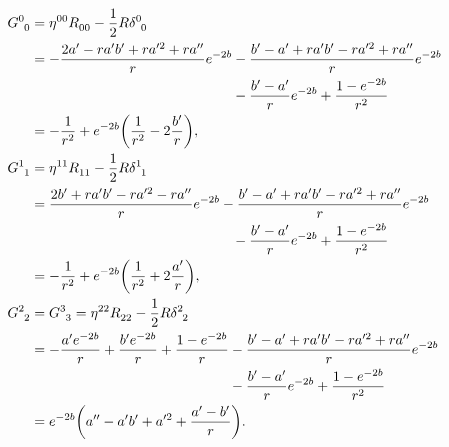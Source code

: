 \begingroup
\allowdisplaybreaks
\begin{subequations}
\begin{align}
    \tensor{G}{^0_0} &=  \tensor{\eta}{^0^0}\tensor{R}{_0_0}-\frac{1}{2}R\tensor{\delta}{^0_0} \nonumber \\
    &= - \frac{2a^\prime-r a^\prime b^\prime +r a^{\prime 2}+r a^{\prime\prime}}{r}e^{-2b} -\frac{b^\prime-a^\prime+r a^\prime b^\prime -r a^{\prime 2}+r a^{\prime\prime}}{r}e^{-2b} \nonumber \\
    &\phantom{{}= - \frac{2a^\prime-r a^\prime b^\prime +r a^{\prime 2}+r a^{\prime\prime}}{r}e^{-2b}} -\frac{b^\prime-a^\prime}{r}e^{-2b}+\frac{1-e^{-2b}}{r^2} \nonumber \\
    &= -\frac{1}{r^2}+e^{-2b}\qty(\frac{1}{r^2}-2\frac{b^\prime}{r}), \\
    \tensor{G}{^1_1} &=  \tensor{\eta}{^1^1}\tensor{R}{_1_1}-\frac{1}{2}R\tensor{\delta}{^1_1} \nonumber \\
    &= \frac{2b^\prime+r a^\prime b^\prime -r a^{\prime 2}-r a^{\prime\prime}}{r}e^{-2b} -\frac{b^\prime-a^\prime+r a^\prime b^\prime -r a^{\prime 2}+r a^{\prime\prime}}{r}e^{-2b} \nonumber \\
    &\phantom{{}= - \frac{2a^\prime-r a^\prime b^\prime +r a^{\prime 2}+r a^{\prime\prime}}{r}e^{-2b}}-\frac{b^\prime-a^\prime}{r}e^{-2b}+\frac{1-e^{-2b}}{r^2} \nonumber \\
    &= -\frac{1}{r^2}+e^{-2b}\qty(\frac{1}{r^2}+2\frac{a^\prime}{r}), \\
    \tensor{G}{^2_2}&=\tensor{G}{^3_3} =  \tensor{\eta}{^2^2}\tensor{R}{_2_2}-\frac{1}{2}R\tensor{\delta}{^2_2} \nonumber \\
    &=-\frac{a^\prime e^{-2b}}{r}+\frac{b^\prime e^{-2b}}{r}+\frac{1-e^{-2b}}{r}-\frac{b^\prime-a^\prime+r a^\prime b^\prime -r a^{\prime 2}+r a^{\prime\prime}}{r}e^{-2b} \nonumber \\
    &\phantom{{}= - \frac{a^\prime e^{-2b}}{r}+\frac{b^\prime e^{-2b}}{r}+\frac{1-e^{-2b}}{r}}-\frac{b^\prime-a^\prime}{r}e^{-2b}+\frac{1-e^{-2b}}{r^2} \nonumber \\
    &= e^{-2b}\qty(a^{\prime\prime}-a^{\prime}b^{\prime}+a^{\prime 2}+\frac{a^{\prime}-b^\prime}{r}).
\end{align}
\end{subequations}
\endgroup